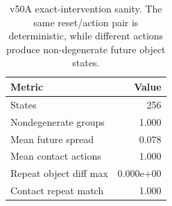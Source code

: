 \begin{table}[t]
\centering
\small
\begin{tabular}{lr}
\toprule
Metric & Value \\
\midrule
States & 256 \\
Nondegenerate groups & 1.000 \\
Mean future spread & 0.078 \\
Mean contact actions & 1.000 \\
Repeat object diff max & 0.000e+00 \\
Contact repeat match & 1.000 \\
\bottomrule
\end{tabular}
\caption{v50A exact-intervention sanity. The same reset/action pair is deterministic, while different actions produce non-degenerate future object states.}
\label{tab:v50a_exact_intervention_sanity}
\end{table}
